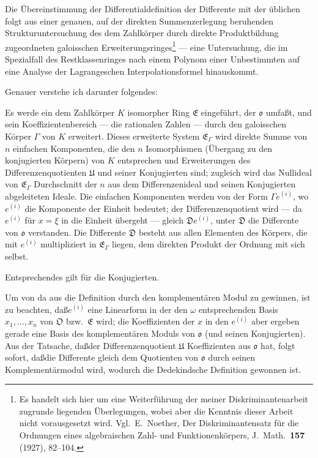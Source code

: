 \documentclass[10pt,a4paper]{article}
\theoremstyle{plain}
\theoremstyle{definition}
\theoremstyle{remark}
\newcommand{\ido}{\mathfrak{o}}
\newcommand{\idD}{\mathfrak{D}}
\newcommand{\cO}{\mathfrak{O}}
\newcommand{\cE}{\mathfrak{E}}
\begin{document}
Die \"Ubereinstimmung der Differentialdefinition der Differente mit der \"ublichen folgt aus einer genauen, auf der direkten Summenzerlegung beruhenden Strukturuntersuchung des dem Zahlk\"orper durch direkte Produktbildung zugeordneten galoisschen Erweiterungsringes\footnote{Es handelt sich hier um eine Weiterf\"uhrung der meiner Diskriminantenarbeit zugrunde liegenden \"Uberlegungen, wobei aber die Kenntnis dieser Arbeit nicht vorausgesetzt wird. Vgl.\ E.\ Noether, Der Diskriminantensatz f\"ur die Ordnungen eines algebraischen Zahl- und Funktionenk\"orpers, J.\ Math.\ \textbf{157} (1927), 82--104.} --- eine Untersuchung, die im Spezialfall des Restklassenringes nach einem Polynom einer Unbestimmten auf eine Analyse der Lagrangeschen Interpolationsformel hinauskommt.

Genauer verstehe ich darunter folgendes:

Es werde ein dem Zahlk\"orper $K$ isomorpher Ring $\cE$ eingef\"uhrt, der $\ido$ umfa\ss t, und sein Koeffizientenbereich --- die rationalen Zahlen --- durch den galoisschen K\"orper $\Gamma$ von $K$ erweitert. Dieses erweiterte System $\cE_{\Gamma}$ wird direkte Summe von $n$ einfachen Komponenten, die den $n$ Isomorphismen (\"Ubergang zu den konjugierten K\"orpern) von $K$ entsprechen und Erweiterungen des Differenzenquotienten $\mathfrak{U}$ und seiner Konjugierten sind; zugleich wird das Nullideal von $\cE_{\Gamma}$ Durchschnitt der $n$ aus dem Differenzenideal und seinen Konjugierten abgeleiteten Ideale. Die einfachen Komponenten werden von der Form $\Gamma e^{(i)}$, wo $e^{(i)}$ die Komponente der Einheit bedeutet; der Differenzenquotient wird --- da $e^{(i)}$ f\"ur $x=\xi$ in die Einheit \"ubergeht --- gleich $\idD e^{(i)}$, unter $\idD$ die Differente von $\ido$ verstanden. Die Differente $\idD$ besteht aus allen Elementen des K\"orpers, die mit $e^{(i)}$ multipliziert in $\cE_{\Gamma}$ liegen, dem direkten Produkt der Ordnung mit sich selbst.

Entsprechendes gilt f\"ur die Konjugierten.

Um von da aus die Definition durch den komplement\"aren Modul zu gewinnen, ist zu beachten, da\ss  $e^{(i)}$ eine Linearform in der den $\omega$ entsprechenden Basis $x_1,\ldots,x_n$ von $\cO$ bzw.\ $\cE$ wird; die Koeffizienten der $x$ in den $e^{(i)}$ aber ergeben gerade eine Basis des komplement\"aren Moduls von $\ido$ (und seinen Konjugierten). Aus der Tatsache, da\ss  der Differenzenquotient $\mathfrak{U}$ Koeffizienten aus $\ido$ hat, folgt sofort, da\ss  die Differente gleich dem Quotienten von $\ido$ durch seinen Komplement\"armodul wird, wodurch die Dedekindsche Definition gewonnen ist.
\end{document}
